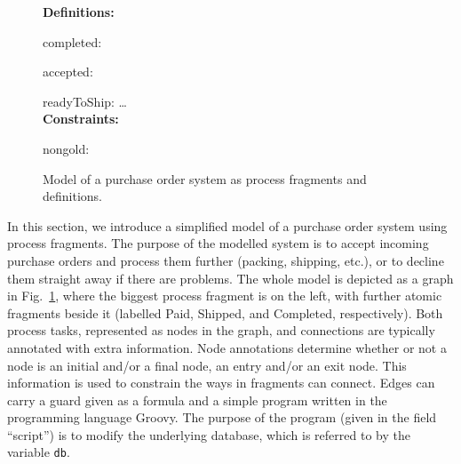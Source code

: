 \documentclass{llncs}
\begin{document}
\begin{figure}[tbp]

\textbf{Definitions:}

completed: 

accepted: 

readyToShip:  \ldots\\

\textbf{Constraints:}

nongold: 

\caption{Model of a purchase order system as process fragments and definitions.}
\label{fig:purchase}
\end{figure}

In this section, we introduce a simplified model of a purchase order
system using process fragments.  The purpose of the modelled system is
to accept incoming purchase orders and process them further (packing,
shipping, etc.), or to decline them straight away if there are
problems.
The whole model is depicted as a graph in Fig.~\ref{fig:purchase}, where
the biggest process fragment is on the left, with further atomic
fragments beside it (labelled Paid, Shipped, and Completed,
respectively).
Both process tasks, represented as nodes in the graph,
and connections are typically annotated with extra information.
Node annotations determine whether or not a node is an initial and/or a final node, an entry and/or an exit node.
This information is used to constrain the ways in fragments can connect.
Edges can carry a guard given as a
formula and a simple program written in the programming language Groovy.
The purpose of the program (given in the field ``script'') is to modify
the underlying database, which is referred to by the variable \verb+db+.
\end{document}
